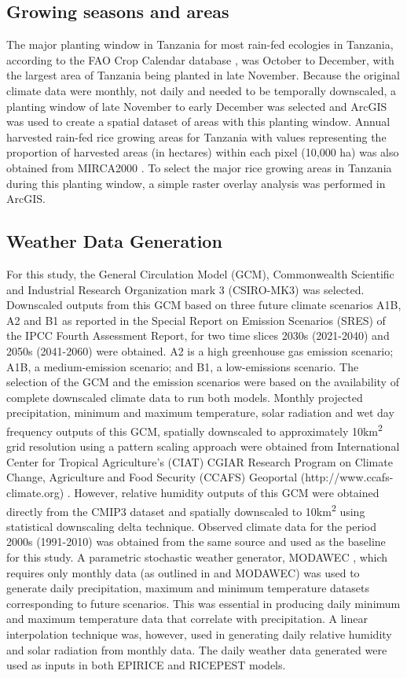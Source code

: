 \documentclass[preprint,review,12pt]{elsarticle}
\begin{document}
    \subsection{Growing seasons and areas}
    The major planting window in Tanzania for most rain-fed ecologies in Tanzania, according to the FAO Crop Calendar database \cite{FAOCropCalendar}, was October to December, with the largest area of Tanzania being planted in late November. Because the original climate data were monthly, not daily and needed to be temporally downscaled, a planting window of late November to early December was selected and ArcGIS was used to create a spatial dataset of areas with this planting window. Annual harvested rain-fed rice growing areas for Tanzania with values representing the proportion of harvested areas (in hectares) within each pixel (10,000 ha) was also obtained from MIRCA2000 \cite{Portmann2010}. To select the major rice growing areas in Tanzania during this planting window, a simple raster overlay analysis was performed in ArcGIS.
    
    \subsection{Weather Data Generation}
    For this study, the General Circulation Model (GCM), Commonwealth Scientific and Industrial Research Organization mark 3 (CSIRO-MK3) was selected. Downscaled outputs from this GCM based on three future climate scenarios A1B, A2 and B1 as reported in the Special Report on Emission Scenarios (SRES) of the IPCC Fourth Assessment Report, for two time slices 2030s (2021-2040) and 2050s (2041-2060) were obtained. A2 is a high greenhouse gas emission scenario; A1B, a medium-emission scenario; and B1, a low-emissions scenario. The selection of the GCM and the emission scenarios were based on the availability of complete downscaled climate data to run both models. Monthly projected precipitation, minimum and maximum temperature, solar radiation and wet day frequency outputs of this GCM, spatially downscaled to approximately 10km\textsuperscript{2} grid resolution using a pattern scaling approach were obtained from International Center for Tropical Agriculture's (CIAT) CGIAR Research Program on Climate Change, Agriculture and Food Security (CCAFS) Geoportal (http://www.ccafs-climate.org) \cite{Jones2009}. However, relative humidity outputs of this GCM were obtained directly from the CMIP3 dataset and spatially downscaled to 10km\textsuperscript{2} using statistical downscaling delta technique. Observed climate data for the period 2000s (1991-2010) was obtained from the same source and used as the baseline for this study. A parametric stochastic weather generator, MODAWEC \cite{Liu2009}, which requires only monthly data (as outlined in \citet{Geng1986} and MODAWEC) was used to generate daily precipitation, maximum and minimum temperature datasets corresponding to future scenarios. This was essential in producing daily minimum and maximum temperature data that correlate with precipitation. A linear interpolation technique was, however, used in generating daily relative humidity and solar radiation from monthly data. The daily weather data generated were used as inputs in both EPIRICE and RICEPEST models.
    
\end{document}
